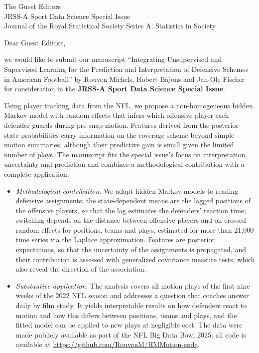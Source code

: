 \documentclass[11pt,a4paper]{letter}
\date{\today}
\begin{document}
\begin{letter}{The Guest Editors\\ JRSS-A Sport Data Science Special Issue\\ Journal of the Royal Statistical Society Series A: Statistics in Society}

\opening{Dear Guest Editors,}

we would like to submit our manuscript ``Integrating Unsupervised and Supervised Learning for the Prediction and Interpretation of Defensive Schemes in American Football'' by Rouven Michels, Robert Bajons and Jan-Ole Fischer for consideration in the \textbf{JRSS-A Sport Data Science Special Issue}.

Using player tracking data from the NFL, we propose a non-homogeneous hidden Markov model with random effects that infers which offensive player each defender guards during pre-snap motion. Features derived from the posterior state probabilities carry information on the coverage scheme beyond simple motion summaries, although their predictive gain is small given the limited number of plays. The manuscript fits the special issue's focus on interpretation, uncertainty and prediction and combines a methodological contribution with a complete application:
\begin{itemize}
\item \textit{Methodological contribution.} We adapt hidden Markov models to reading defensive assignments: the state-dependent means are the lagged positions of the offensive players, so that the lag estimates the defenders' reaction time; switching depends on the distance between offensive players and on crossed random effects for positions, teams and plays, estimated for more than 21,000 time series via the Laplace approximation. Features are posterior expectations, so that the uncertainty of the assignments is propagated, and their contribution is assessed with generalized covariance measure tests, which also reveal the direction of the association.
\item \textit{Substantive application.} The analysis covers all motion plays of the first nine weeks of the 2022 NFL season and addresses a question that coaches answer daily by film study. It yields interpretable results on how defenders react to motion and how this differs between positions, teams and plays, and the fitted model can be applied to new plays at negligible cost. The data were made publicly available as part of the NFL Big Data Bowl 2025; all code is available at \url{https://github.com/RouvenM/HMMotion-code}.
\end{itemize}


\end{letter}
\end{document}
